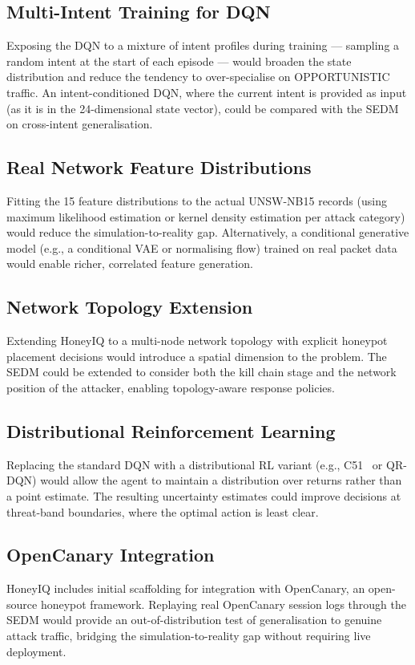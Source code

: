 \subsection{Multi-Intent Training for DQN}

Exposing the DQN to a mixture of intent profiles during training --- sampling
a random intent at the start of each episode --- would broaden the state
distribution and reduce the tendency to over-specialise on OPPORTUNISTIC
traffic.
An intent-conditioned DQN, where the current intent is provided as input
(as it is in the 24-dimensional state vector), could be compared with the
SEDM on cross-intent generalisation.

\subsection{Real Network Feature Distributions}

Fitting the 15 feature distributions to the actual UNSW-NB15 records
(using maximum likelihood estimation or kernel density estimation per
attack category) would reduce the simulation-to-reality gap.
Alternatively, a conditional generative model (e.g., a conditional VAE
or normalising flow) trained on real packet data would enable richer,
correlated feature generation.

\subsection{Network Topology Extension}

Extending HoneyIQ to a multi-node network topology with explicit honeypot
placement decisions would introduce a spatial dimension to the problem.
The SEDM could be extended to consider both the kill chain stage and the
network position of the attacker, enabling topology-aware response policies.

\subsection{Distributional Reinforcement Learning}

Replacing the standard DQN with a distributional RL variant
(e.g., C51~\citep{wang2016dueling} or QR-DQN) would allow the agent to
maintain a distribution over returns rather than a point estimate.
The resulting uncertainty estimates could improve decisions at threat-band
boundaries, where the optimal action is least clear.

\subsection{OpenCanary Integration}

HoneyIQ includes initial scaffolding for integration with OpenCanary,
an open-source honeypot framework.
Replaying real OpenCanary session logs through the SEDM would provide an
out-of-distribution test of generalisation to genuine attack traffic,
bridging the simulation-to-reality gap without requiring live deployment.
